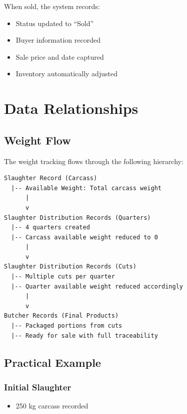 \documentclass[11pt,a4paper]{article}
\begin{document}
When sold, the system records:

\begin{itemize}[leftmargin=*]
    \item Status updated to ``Sold''
    \item Buyer information recorded
    \item Sale price and date captured
    \item Inventory automatically adjusted
\end{itemize}

\section{Data Relationships}

\subsection{Weight Flow}

The weight tracking flows through the following hierarchy:

\begin{center}
\begin{minipage}{0.8\textwidth}
\begin{verbatim}
Slaughter Record (Carcass)
  |-- Available Weight: Total carcass weight
      |
      v
Slaughter Distribution Records (Quarters)
  |-- 4 quarters created
  |-- Carcass available weight reduced to 0
      |
      v
Slaughter Distribution Records (Cuts)
  |-- Multiple cuts per quarter
  |-- Quarter available weight reduced accordingly
      |
      v
Butcher Records (Final Products)
  |-- Packaged portions from cuts
  |-- Ready for sale with full traceability
\end{verbatim}
\end{minipage}
\end{center}

\subsection{Practical Example}

\subsubsection{Initial Slaughter}
\begin{itemize}[leftmargin=*]
    \item 250 kg carcass recorded
\end{itemize}
\end{document}
